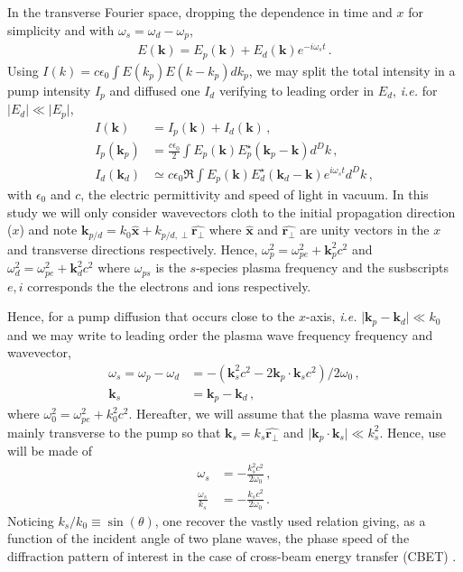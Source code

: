 \documentclass[
 reprint,
 amsmath,amssymb,
 aps,
]{revtex4-1}
\begin{document}
In the transverse Fourier space, dropping the dependence in time and $x$ for simplicity and with $\omega_s=\omega_d - \omega_p$,
\begin{align}
E(\mathbf{k}) =     E_p(\mathbf{k})
+  E_d(\mathbf{k}) e^{ -i \omega_s t}   \, .
\end{align} 
Using $I(k)=c\epsilon_0 \int E(k_p) E(k-k_p) dk_p$, we may split the total intensity in a pump intensity $I_p$ and diffused one $I_d$ verifying to leading order in $E_d$, \emph{i.e.} for $\vert E_d\vert \ll \vert E_p \vert$, 
\begin{align}
I(\mathbf{k}) &=I_p(\mathbf{k})+I_d(\mathbf{k})\, , \label{eq:itot}\\
I_p(\mathbf{k}_p) &=   \frac{c\epsilon_0}{2} \int E_p(\mathbf{k}) E_p^\star(\mathbf{k}_p-\mathbf{k}) d^Dk \, , \label{eq:ip} \\
I_d(\mathbf{k}_d) &\simeq   c\epsilon_0  \Re \int E_p(\mathbf{k}) E_d^\star(\mathbf{k}_d-\mathbf{k})e^{i\omega_s t } d^Dk \, , \label{eq:id}
\end{align}
with $\epsilon_0$ and  $c$, the electric permittivity and speed of light in vacuum.
In this study we will only consider wavevectors cloth to the initial
propagation direction ($x$) and note $\mathbf{k}_{p/d}=k_0\hat{\mathbf{x}} +k_{p/d,\perp}\hat{\mathbf{r}_\perp}  $ where $\hat{\mathbf{x}}$ and $\hat{\mathbf{r}_\perp}$ are unity vectors in the $x$ and transverse directions respectively. Hence, $\omega_p^2 = \omega_{pe}^2+ \mathbf{k}_p^2c^2$ and $\omega_d^2 = \omega_{pe}^2+\mathbf{k}_d^2c^2$ where $\omega_{ps}$ is the $s$-species plasma frequency and the susbscripts $e,i$ corresponds the the electrons and ions respectively.

Hence, for a pump  diffusion that occurs close to the $x$-axis,  \emph{i.e.}  $\vert \mathbf{k}_p -\mathbf{k}_d\vert \ll k_0$ and we may write to leading order the plasma wave frequency frequency and wavevector,
\begin{align}
\omega_s=\omega_p-\omega_d&= -(\mathbf{k}_s^2 c^2-2\mathbf{k}_p\cdot\mathbf{k}_s c^2)/2\omega_0
\, , \nonumber\\
\mathbf{k}_s& = \mathbf{k}_p-\mathbf{k}_d\, ,
\end{align}
where $\omega_0^2= \omega_{pe}^2+ k_0^2c^2$.
Hereafter, we will assume that the plasma wave remain mainly transverse to the pump so that $\mathbf{k}_s=k_s \hat{\mathbf{r}_\perp}$ and $ \vert \mathbf{k}_p\cdot\mathbf{k}_s\vert \ll k_s^2$. 
Hence, use will be made of 
\begin{align}
\omega_s  &= -\frac{k_s^2 c^2 }{2\omega_0} \, ,\label{eq:ws}\\
\frac{\omega_s}{k_s}& = -\frac{k_s c^2 }{2\omega_0} \label{eq:vphis} \, .
\end{align}
Noticing $k_s/k_0\equiv \sin(\theta) $, one recover the vastly used  relation giving, as a function of the incident angle of two plane waves, the phase speed of the  diffraction pattern of interest in the case of cross-beam energy transfer (CBET) \cite[]{POP_Debayle_2018}.
\end{document}
